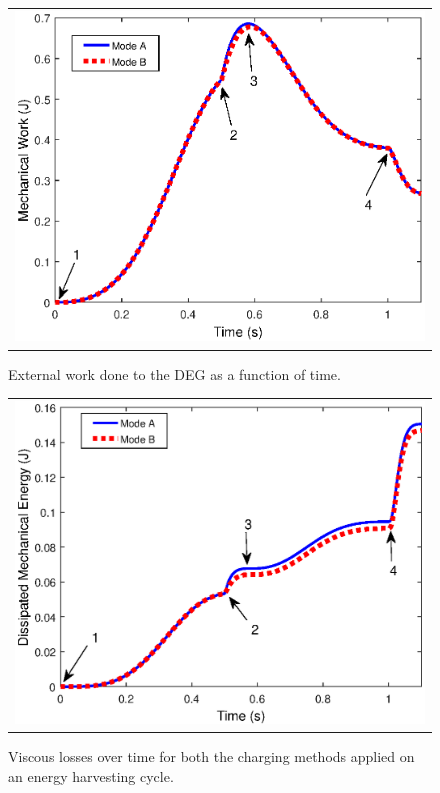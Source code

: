    \begin{figure}[htb]
   \begin{center}
   \begin{tabular}{c} %
   \includegraphics[scale=0.8]{fig02/Fig5_unit.eps}
   \end{tabular}
   \end{center}
   \caption[example] 
   { \label{fig:Cycle txW} 
External work done to the DEG as a function of time.}
   \end{figure}  

   \begin{figure}[htb]
   \begin{center}
   \begin{tabular}{c} %
   \includegraphics[scale=0.8]{fig02/Fig6_unit.eps}
   \end{tabular}
   \end{center}
   \caption[example] 
   { \label{fig:Cycle txW_loss} 
Viscous losses over time for both the charging methods applied on an energy harvesting cycle.}
   \end{figure}   

